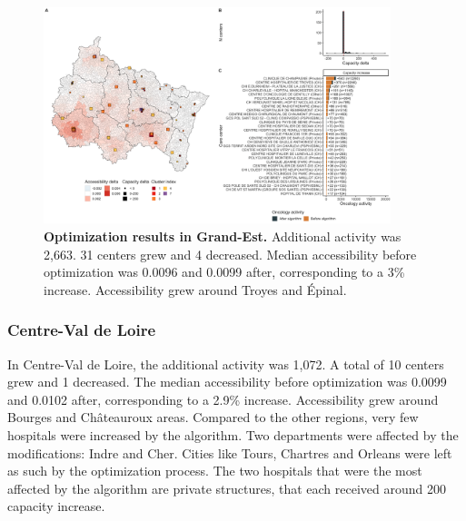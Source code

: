 \begin{figure}[h!]
    \includegraphics[width=0.9\textwidth]{images/camion/optim_region/optim_Grand-Est.png}
    \centering
    \caption{ \textbf{Optimization results in Grand-Est.} Additional activity
        was 2,663. 31 centers grew and 4 decreased. Median accessibility before
        optimization was 0.0096 and 0.0099 after, corresponding to a 3\%
        increase. Accessibility grew around Troyes and Épinal. }
\end{figure}

\subsubsection{Centre-Val de Loire}

In Centre-Val de Loire, the additional activity was 1,072. A total of 10 centers
grew and 1 decreased. The median accessibility before optimization was 0.0099 and
0.0102 after, corresponding to a 2.9\% increase. Accessibility grew around
Bourges and Châteauroux areas. Compared to the other regions, very few hospitals
were increased by the algorithm. Two departments were affected by the modifications:
Indre and Cher. Cities like Tours, Chartres and Orleans were left as such by
the optimization process. The two hospitals that were the most affected by the
algorithm are private structures, that each received around 200 capacity increase.

